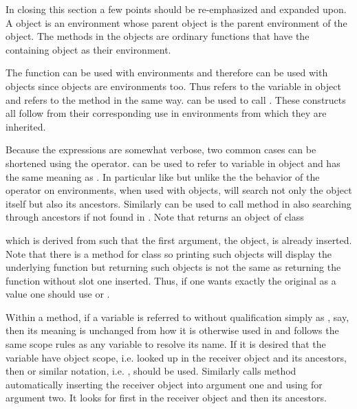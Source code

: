 \documentclass{Z}
\begin{document}
In closing this section a few points should be re-emphasized and 
expanded upon.  A
 object is an environment whose parent object is the
parent environment of the  object.  The methods in the 
objects are ordinary functions that have the containing object as their
environment.  

The   function can be used with environments and
therefore can be used with  objects since 
objects are environments too.  Thus  refers 
to the variable  in  object 
and  refers to the method 
in the same way.   can be used
to call .  These constructs all follow from their corresponding
use in environments from which they are inherited.

Because the  expressions are somewhat verbose, two common
cases can be shortened using the \code{\$} operator.  
can be used to refer to variable  in  object
 and has the same meaning as .  
In particular like  but 
unlike the the behavior of the \code{\$} operator on
environments, when used with  objects, \code{\$} will
search not only the object itself but also its ancestors.
Similarly  can be used to call
method  in  also searching through ancestors
if not found in .  Note that 
returns an object of class

which is derived from  such that the first argument,
the  object,
is already inserted.  Note that there is a  method for
class  so printing such objects will
display the underlying function but returning such objects 
is not the same as returning the function without slot one inserted.
Thus, if one wants exactly the original 
as a value one should use  or 
.  

Within a method, if a variable is referred to without
qualification simply as , say, then  its meaning  is
unchanged from how it is otherwise used in  and
follows the same scope rules as any variable to resolve its name.  If it is
desired that the variable have object scope, i.e. looked up
in the receiver object and its ancestors, then 
or similar  notation, i.e. , should be used.  
Similarly  calls
method  automatically inserting the receiver object
into argument one and using  for argument two.  It
looks for  first in the receiver object and then its
ancestors.  
\end{document}
